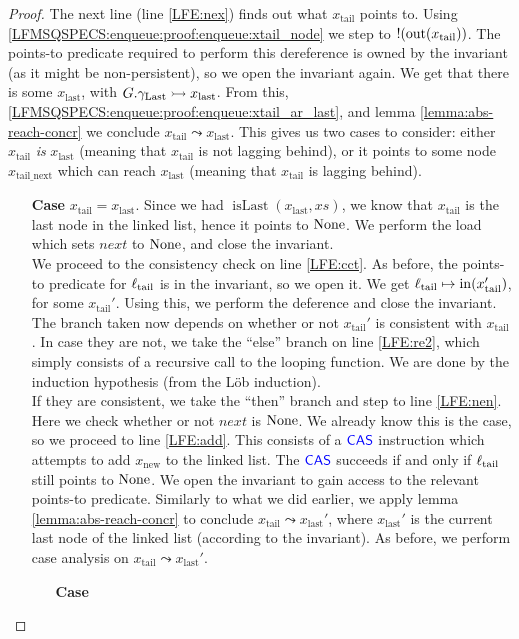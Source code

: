 \documentclass[a4paper, 10pt]{report}
\theoremstyle{definition}
\newcommand{\xsc}{xs}
\newcommand{\isLast}{\operatorname{isLast}}
\newcommand{\locN}[1]{\loc_{\mathrm{#1}}}
\newcommand{\loctail}{\locN{tail}}
\newcommand{\nIn}[1]{\operatorname{in}(#1)}
\newcommand{\nOut}[1]{\operatorname{out}(#1)}
\newcommand{\node}{x}
\newcommand{\nodeN}[1]{\node_{\mathrm{#1}}}
\newcommand{\nodetail}{\nodeN{tail}}
\newcommand{\nodelast}{\nodeN{last}}
\newcommand{\nodenew}{\nodeN{new}}
\newcommand{\nodetailnext}{\nodeN{tail\_next}}
\newcommand{\Qg}{G}
\newcommand{\glast}{\gname_{\mathrm{Last}}}
\newcommand{\reach}[2]{#1 \leadsto #2}
\newcommand{\ap}[2]{#1 \rightarrowtail #2}
\begin{document}
\begin{proof}
  The next line (line \ref{LFE:nex}) finds out what $\nodetail$ points to. Using \ref{LFMSQSPECS:enqueue:proof:enqueue:xtail_node} we step to $\deref (\nOut{\nodetail})$. The points-to predicate required to perform this dereference is owned by the invariant (as it might be non-persistent), so we open the invariant again. We get that there is some $\nodelast$, with $\ap{\Qg.\glast}{\nodelast}$. From this, \ref{LFMSQSPECS:enqueue:proof:enqueue:xtail_ar_last}, and lemma \ref{lemma:abs-reach-concr} we conclude $\reach{\nodetail}{\nodelast}$. This gives us two cases to consider: either $\nodetail$ \textit{is} $\nodelast$ (meaning that $\nodetail$ is not lagging behind), or it points to some node $\nodetailnext$ which can reach $\nodelast$ (meaning that $\nodetail$ is lagging behind).
  \begin{itemize}
    \item[\textbf{Case}]
    $\nodetail = \nodelast$. Since we had $\isLast(\nodelast, \xsc)$, we know that $\nodetail$ is the last node in the linked list, hence it points to $\operatorname{None}$. We perform the load which sets $next$ to $\operatorname{None}$, and close the invariant.\\
    We proceed to the consistency check on line \ref{LFE:cct}. As before, the points-to predicate for $\loctail$ is in the invariant, so we open it. We get $\loctail \mapsto \nIn{\nodetail'}$, for some $\nodetail'$. Using this, we perform the deference and close the invariant. The branch taken now depends on whether or not $\nodetail'$ is consistent with $\nodetail$. In case they are not, we take the ``else'' branch on line \ref{LFE:re2}, which simply consists of a recursive call to the looping function. We are done by the induction hypothesis (from the Löb induction).\\
    If they are consistent, we take the ``then'' branch and step to line \ref{LFE:nen}. Here we check whether or not $next$ is $\operatorname{None}$. We already know this is the case, so we proceed to line \ref{LFE:add}. This consists of a $\textsf{\color{blue} CAS}$ instruction which attempts to add $\nodenew$ to the linked list. The $\textsf{\color{blue} CAS}$ succeeds if and only if $\loctail$ still points to $\operatorname{None}$. We open the invariant to gain access to the relevant points-to predicate. Similarly to what we did earlier, we apply lemma \ref{lemma:abs-reach-concr} to conclude $\reach{\nodetail}{\nodelast'}$, where $\nodelast'$ is the current last node of the linked list (according to the invariant). As before, we perform case analysis on $\reach{\nodetail}{\nodelast'}$.
    \begin{itemize}
      \item[\textbf{Case}]

\end{itemize}
\end{itemize}
\end{proof}
\end{document}
